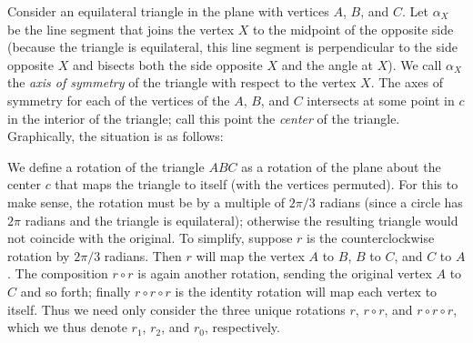 \begin{example}
    Consider an equilateral triangle in the plane with vertices \(A\), \(B\),
    and \(C\). Let \(\alpha_X\) be the line segment that joins the vertex \(X\)
    to the midpoint of the opposite side (because the triangle is equilateral,
    this line segment is perpendicular to the side opposite \(X\) and bisects
    both the side opposite \(X\) and the angle at \(X\)). We call \(\alpha_X\)
    the \emph{axis of symmetry} of the triangle with respect to the vertex
    \(X\). The axes of symmetry for each of the vertices of the \(A\), \(B\),
    and \(C\) intersects at some point in \(c\) in the interior of the triangle;
    call this point the \emph{center} of the triangle. Graphically, the
    situation is as follows:
    \begin{center}
    \end{center}

    We define a rotation of the triangle \(ABC\) as a rotation of the plane
    about the center \(c\) that maps the triangle to itself (with the vertices
    permuted). For this to make sense, the rotation must be by a multiple of
    \(2\pi/3\) radians (since a circle has \(2\pi\) radians and the triangle is
    equilateral); otherwise the resulting triangle would not coincide with the
    original. To simplify, suppose \(r\) is the counterclockwise rotation by
    \(2\pi/3\) radians. Then \(r\) will map the vertex \(A\) to \(B\), \(B\) to
    \(C\), and \(C\) to \(A\). The composition \(r \circ r\) is again another
    rotation, sending the original vertex \(A\) to \(C\) and so forth; finally
    \(r \circ r \circ r\) is the identity rotation will map each vertex to
    itself. Thus we need only consider the three unique rotations \(r\), \(r
    \circ r\), and \(r \circ r \circ r\), which we thus denote \(r_1\), \(r_2\),
    and \(r_0\), respectively.


\end{example}
